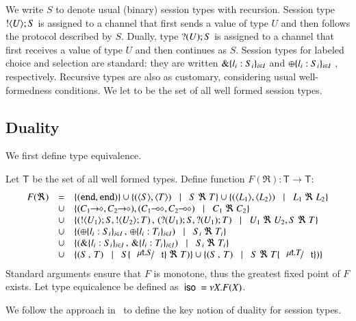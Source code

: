 We write $S$ to denote usual (binary) session types with recursion. 
Session type $! \langle U \rangle ; S$ is assigned to a channel that first sends a 
value of type $U$ and then follows
the protocol described by $S$.
Dually, type $? (U) ; S$ is assigned to a channel  
that first receives a value of type $U$ and then continues as $S$. 
Session types for labeled choice and selection are standard: they are 
written $\& \{l_i:S_i\}_{i \in I}$ and $\oplus \{l_i:S_i\}_{i \in I}$ , respectively. 
Recursive types are also as customary, considering usual 
well-formedness conditions. We let \ST to be the set of
all well formed session types.

\subsection{Duality}
We first define type equivalence.
%
\begin{definition}\rm
\label{def:type_equiv}
	Let $\mathsf{T}$ be the set of all well formed types.
	Define function $F(\Re): \mathsf{T} \longrightarrow \mathsf{T}$:
	\[
		\begin{array}{rcl}
			F(\Re) 	&=&	\set{(\tinact, \tinact)}
				\cup	\set{(\chtype{S}, \chtype{T}) \bnfbar S\ \Re\ T} \cup \set{(\chtype{L_1}, \chtype{L_2}) \bnfbar L_1\ \Re\ L_2}\\
				&\cup&	\set{(\shot{C_1}, \shot{C_2}), (\lhot{C_1}, \lhot{C_2}) \bnfbar C_1\ \Re\ C_2}\\
				&\cup&	\set{(\btout{U_1} S, \btout{U_2} T)\,,\, (\btinp{U_1} S, \btinp{U_1} T) \bnfbar U_1\ \Re\ U_2, S\ \Re\ T}\\
				&\cup&	\set{(\btsel{l_i: S_i}_{i \in I} \,,\, \btsel{l_i: T_i}_{i \in I}) \bnfbar  S_i\ \Re\ T_i}\\
				&\cup&	\set{(\btbra{l_i: S_i}_{i \in I}\,,\, \btbra{l_i: T_i}_{i \in I}) \bnfbar S_i\ \Re\ T_i}\\
				&\cup&	\set{(S\,,\, T) \bnfbar S\subst{\trec{t}{S}}{\vart{t}}\ \Re\ T)}
				\cup	\set{(S\,,\, T) \bnfbar S\ \Re\ T\subst{\trec{t}{T}}{\vart{t}})}
		\end{array}
	\]	
	\noi Standard arguments ensure that $F$ is monotone, thus the greatest fixed point
	of $F$ exists. Let type equicalence be defined as $\ \mathsf{iso}\  = \nu X. F(X)$.
\end{definition}
%
We follow the approach in~\cite{onSessionDualityBDGK} to define the 
key notion of duality for session types.
